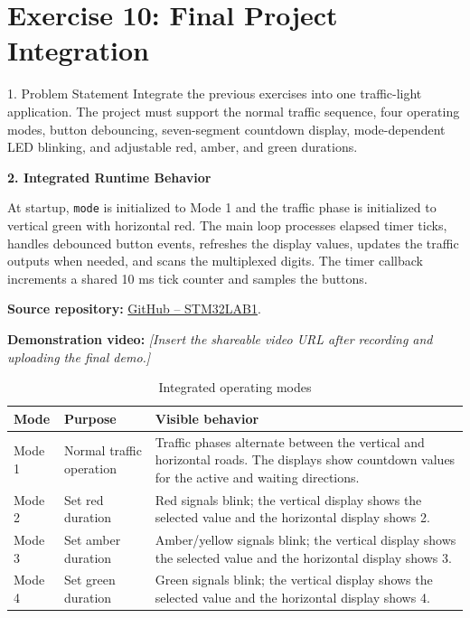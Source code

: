 \clearpage
\section*{Exercise 10: Final Project Integration}

\begin{questionbox}{1. Problem Statement}
Integrate the previous exercises into one traffic-light application. The project must support the normal traffic sequence, four operating modes, button debouncing, seven-segment countdown display, mode-dependent LED blinking, and adjustable red, amber, and green durations.
\end{questionbox}

\vspace{0.4cm}
\textbf{2. Integrated Runtime Behavior}

At startup, \texttt{mode} is initialized to Mode 1 and the traffic phase is initialized to vertical green with horizontal red. The main loop processes elapsed timer ticks, handles debounced button events, refreshes the display values, updates the traffic outputs when needed, and scans the multiplexed digits. The timer callback increments a shared 10 ms tick counter and samples the buttons.

\noindent\textbf{Source repository:} \href{https://github.com/haunguyen-2006/STM32LAB1}{GitHub -- STM32LAB1}.\par
\noindent\textbf{Demonstration video:} \textit{[Insert the shareable video URL after recording and uploading the final demo.]}

\begin{table}[H]
    \centering
    \small
    \caption{Integrated operating modes}
    \label{tab:exercise10_modes}
    \begin{tabularx}{\textwidth}{>{\raggedright\arraybackslash}p{2.0cm} >{\raggedright\arraybackslash}p{3.3cm} X}
        \toprule
        \textbf{Mode} & \textbf{Purpose} & \textbf{Visible behavior} \\
        \midrule
        Mode 1 & Normal traffic operation & Traffic phases alternate between the vertical and horizontal roads. The displays show countdown values for the active and waiting directions. \\
        Mode 2 & Set red duration & Red signals blink; the vertical display shows the selected value and the horizontal display shows 2. \\
        Mode 3 & Set amber duration & Amber/yellow signals blink; the vertical display shows the selected value and the horizontal display shows 3. \\
        Mode 4 & Set green duration & Green signals blink; the vertical display shows the selected value and the horizontal display shows 4. \\
        \bottomrule
    \end{tabularx}
\end{table}

